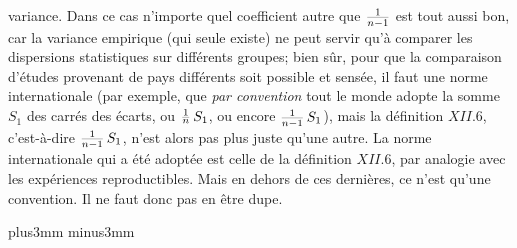 variance. Dans ce cas n'importe quel coef\-fi\-cient autre que ${1 \over 
n-1}$ est tout aussi bon, car la variance empirique (qui seule existe) 
ne peut servir qu'\`a comparer les dispersions statistiques sur 
diff\'erents groupes; bien s\^ur,  pour que la comparaison d'\'etudes
provenant de pays diff\'erents soit possible et sens\'ee, il faut une 
norme internationale (par exemple, que {\it par convention} tout le 
monde adopte la somme $S_1$ des carr\'es des \'ecarts, ou ${1\over 
\textdown{n}}\, S_1$, ou encore ${1\over n-1}\, S_1$), mais la 
d\'efinition $XII.6$, c'est-\`a-dire ${1\over n-1}\, S_1$, n'est alors
pas plus juste qu'une autre. 
\medskip 
La norme internationale qui a \'et\'e adopt\'ee est celle de la
d\'efinition $XII.6$, par analogie avec les exp\'eriences reproductibles. 
Mais en dehors de ces derni\`eres, ce n'est qu'une convention. Il ne faut 
donc pas en \^etre dupe. 
 
\vskip6mm plus3mm minus3mm 
 
